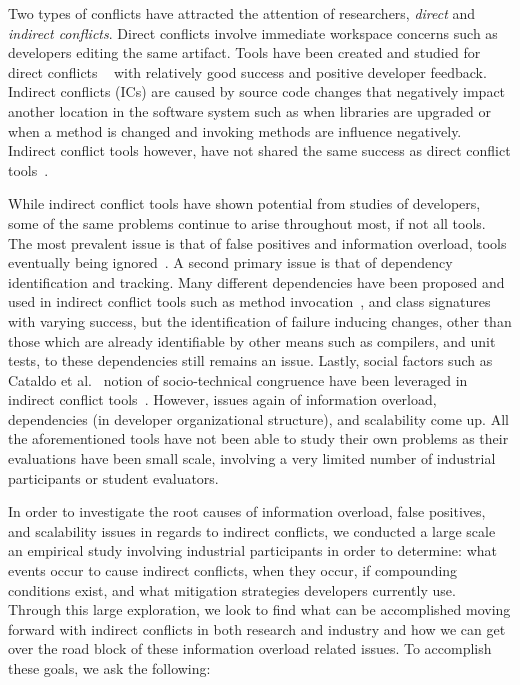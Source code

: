 \documentclass[conference]{IEEEtran}
\begin{document}
Two types of conflicts have attracted the attention of researchers, \textit{direct} and
\textit{indirect conflicts}. Direct conflicts involve immediate workspace concerns such as developers editing the same
artifact. Tools have been created and studied for direct conflicts
~\cite{Xiang:2008:ERT, Biehl:2007:FVD, Sarma:2009:TIV, Khurana:2009:PFC} with relatively good success and
positive developer feedback. Indirect conflicts (ICs) are caused by source code changes that negatively impact another
location in the software system such as when libraries are upgraded or when a method is changed
and invoking methods are influence negatively. Indirect conflict tools however, have
not shared the same success as direct conflict
tools~\cite{Sarma:2007:TSA, Holmes:2010:CAR, Trainer:2005:BGT, Servant:2010:CPI, Borici:2012:CHA}.

While indirect conflict tools have shown potential from studies of developers, some of the same problems continue
to arise throughout most, if not all tools. The most prevalent issue is that of false positives and information
overload, tools eventually being
ignored~\cite{Sarma:2007:TSA, Servant:2010:CPI}. A second primary issue is that of dependency identification and
tracking. Many different dependencies have been proposed and used in indirect conflict tools such as method
invocation~\cite{Trainer:2005:BGT}, and class signatures~\cite{Sarma:2007:TSA} with varying success, but the
identification of failure inducing changes, other than those which are already identifiable by other means such
as compilers, and unit tests, to these dependencies still remains an issue.
Lastly, social factors such as Cataldo et al.~\cite{Cataldo:2006:ICR} notion of socio-technical
congruence have been leveraged in indirect conflict tools~\cite{Kwan:2011:ESC, Begel:2010:CDE, Borici:2012:CHA}.
However, issues again of information overload, dependencies (in developer organizational structure), and scalability
come up. All the aforementioned tools have not been able to study their own problems as their evaluations have
been small scale, involving a very limited number of industrial participants or student evaluators.

In order to investigate the root causes of information overload, false positives, and
scalability issues in regards to indirect conflicts, we conducted a large scale an empirical study involving industrial
participants in order to determine: what events occur to
cause indirect conflicts, when they occur, if compounding conditions exist, and what mitigation strategies developers currently
use. Through this large exploration, we look to find what can be accomplished moving forward with indirect conflicts
in both research and industry and how we can get over the road block of these information overload related
issues. To accomplish these goals, we ask the following:
\end{document}
